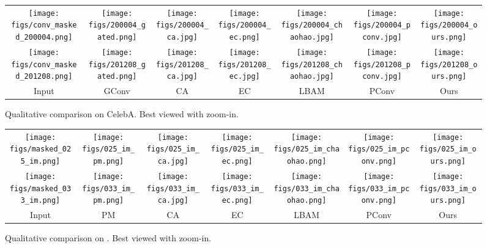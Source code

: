 \documentclass[journal]{IEEEtran}
\begin{document}
\begin{figure*}[!h]
\begin{center}
\setlength{\tabcolsep}{0.5mm}
\begin{tabular}{ccccccc}
\centering
\texttt{[image: figs/conv\_masked\_200004.png]}&
\texttt{[image: figs/200004\_gated.png]}&
\texttt{[image: figs/200004\_ca.jpg]}&
\texttt{[image: figs/200004\_ec.png]}&
\texttt{[image: figs/200004\_chaohao.jpg]}&
\texttt{[image: figs/200004\_pconv.jpg]}&
\texttt{[image: figs/200004\_ours.png]}\\
\texttt{[image: figs/conv\_masked\_201208.png]}&
\texttt{[image: figs/201208\_gated.png]}&
\texttt{[image: figs/201208\_ca.jpg]}&
\texttt{[image: figs/201208\_ec.jpg]}&
\texttt{[image: figs/201208\_chaohao.jpg]}&
\texttt{[image: figs/201208\_pconv.jpg]}&
\texttt{[image: figs/201208\_ours.png]}\\

\small{Input}& \small{GConv}& \small{CA}& \small{EC}&\small{LBAM}&\small{PConv}&\small{Ours}\\
\end{tabular}
\end{center}
\caption{Qualitative comparison on CelebA. Best viewed with zoom-in.}
\label{fig:comp_on_celeba}
\end{figure*}

\begin{figure*}[!h]
\begin{center}
\setlength{\tabcolsep}{0.5mm}
\begin{tabular}{ccccccc}
\centering
\texttt{[image: figs/masked\_025\_im.png]}&
\texttt{[image: figs/025\_im\_pm.png]}&
\texttt{[image: figs/025\_im\_ca.jpg]}&
\texttt{[image: figs/025\_im\_ec.png]}&
\texttt{[image: figs/025\_im\_chaohao.png]}&
\texttt{[image: figs/025\_im\_pconv.png]}&
\texttt{[image: figs/025\_im\_ours.png]}\\

\texttt{[image: figs/masked\_033\_im.png]}&
\texttt{[image: figs/033\_im\_pm.png]}&
\texttt{[image: figs/033\_im\_ca.jpg]}&
\texttt{[image: figs/033\_im\_ec.png]}&
\texttt{[image: figs/033\_im\_chaohao.png]}&
\texttt{[image: figs/033\_im\_pconv.png]}&
\texttt{[image: figs/033\_im\_ours.png]}\\

\small{Input}& \small{PM}& \small{CA}& \small{EC}&\small{LBAM}&\small{PConv}&\small{Ours}\\
\end{tabular}
\end{center}
\caption{Qualitative comparison on {\color{black}{Paris StreetView}}. Best viewed with zoom-in.}
\label{fig:comp_on_psv}
\end{figure*}
\end{document}
